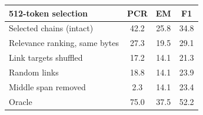 \begin{tabular}{@{}lccc@{}}
\toprule
512-token selection & PCR & EM & F1 \\
\midrule
Selected chains (intact) & 42.2 & 25.8 & 34.8 \\
Relevance ranking, same bytes & 27.3 & 19.5 & 29.1 \\
Link targets shuffled & 17.2 & 14.1 & 21.3 \\
Random links & 18.8 & 14.1 & 23.9 \\
Middle span removed & 2.3 & 14.1 & 23.4 \\
Oracle & 75.0 & 37.5 & 52.2 \\
\bottomrule
\end{tabular}
